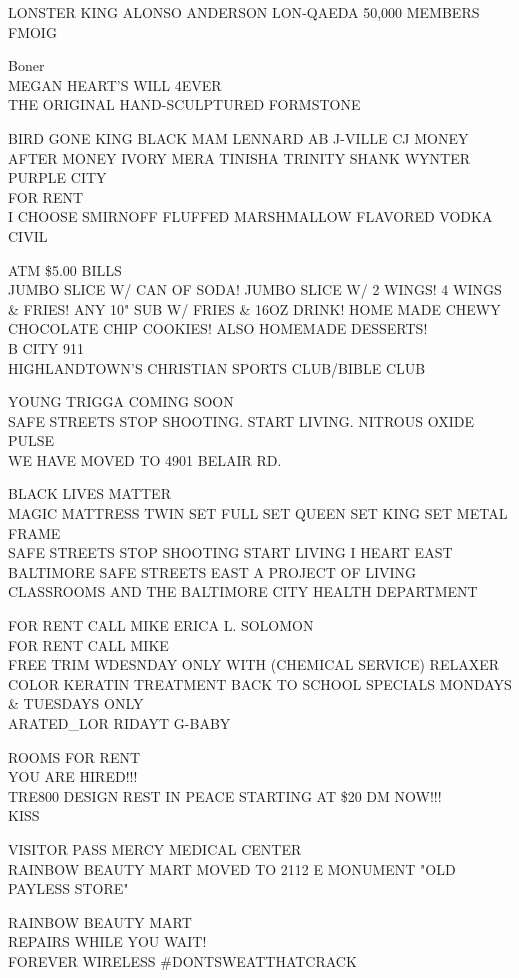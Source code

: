 \documentclass[10pt,letterpaper]{article}
\begin{document}
LONSTER KING ALONSO ANDERSON LON{-}QAEDA 50,000 MEMBERS\\
FMOIG

Boner\\
MEGAN HEART'S WILL 4EVER\\
THE ORIGINAL HAND{-}SCULPTURED FORMSTONE

BIRD GONE KING BLACK MAM LENNARD AB J{-}VILLE CJ MONEY AFTER MONEY IVORY MERA TINISHA TRINITY SHANK WYNTER PURPLE CITY\\
FOR RENT\\
I CHOOSE SMIRNOFF FLUFFED MARSHMALLOW FLAVORED VODKA\\
CIVIL

ATM \$5.00 BILLS\\
JUMBO SLICE W/ CAN OF SODA! JUMBO SLICE W/ 2 WINGS!    4 WINGS \& FRIES!  ANY 10" SUB W/ FRIES \& 16OZ DRINK!  HOME MADE CHEWY CHOCOLATE CHIP COOKIES!  ALSO HOMEMADE DESSERTS!\\
B CITY 911\\
HIGHLANDTOWN'S CHRISTIAN SPORTS CLUB/BIBLE CLUB

YOUNG TRIGGA COMING SOON\\
SAFE STREETS STOP SHOOTING. START LIVING.  NITROUS OXIDE PULSE\\
WE HAVE MOVED TO 4901 BELAIR RD.

BLACK LIVES MATTER\\
MAGIC MATTRESS TWIN SET FULL SET QUEEN SET KING SET METAL FRAME\\
SAFE STREETS STOP SHOOTING START LIVING I HEART EAST BALTIMORE SAFE STREETS EAST A PROJECT OF LIVING CLASSROOMS AND THE BALTIMORE CITY HEALTH DEPARTMENT

FOR RENT CALL MIKE ERICA L. SOLOMON\\
FOR RENT CALL MIKE\\
FREE TRIM WDESNDAY ONLY WITH (CHEMICAL SERVICE) RELAXER COLOR KERATIN TREATMENT BACK TO SCHOOL SPECIALS MONDAYS \& TUESDAYS ONLY\\
ARATED\_LOR RIDAYT G{-}BABY

ROOMS FOR RENT\\
YOU ARE HIRED!!!\\
TRE800 DESIGN REST IN PEACE STARTING AT \$20 DM NOW!!!\\
KISS

VISITOR PASS MERCY MEDICAL CENTER\\
RAINBOW BEAUTY MART MOVED TO 2112 E MONUMENT "OLD PAYLESS STORE"

RAINBOW BEAUTY MART\\
REPAIRS WHILE YOU WAIT!\\
FOREVER WIRELESS \#DONTSWEATTHATCRACK
\end{document}

